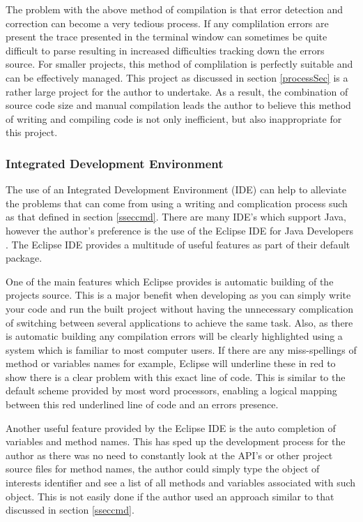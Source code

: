 The problem with the above method of compilation is that error detection and correction can become a very tedious process. If any complilation errors are present the trace presented in the terminal window can sometimes be quite difficult to parse resulting in increased difficulties tracking down the errors source. For smaller projects, this method of complilation is perfectly suitable and can be effectively managed. This project as discussed in section \ref{processSec} is a rather large project for the author to undertake. As a result, the combination of source code size and manual compilation leads the author to believe this method of writing and compiling code is not only inefficient, but also inappropriate for this project.

\subsubsection{Integrated Development Environment}

The use of an Integrated Development Environment (IDE) can help to alleviate the problems that can come from using a writing and complication process such as that defined in section \ref{sseccmd}. There are many IDE's which support Java, however the author's preference is the use of the Eclipse IDE for Java Developers \cite{eclipse:IDE}. The Eclipse IDE provides a multitude of useful features as part of their default package. 

One of the main features which Eclipse provides is automatic building of the projects source. This is a major benefit when developing as you can simply write your code and run the built project without having the unnecessary complication of switching between several applications to achieve the same task. Also, as there is automatic building any compilation errors will be clearly highlighted using a system which is familiar to most computer users. If there are any miss-spellings of method or variables names for example, Eclipse will underline these in red to show there is a clear problem with this exact line of code. This is similar to the default scheme provided by most word processors, enabling a logical mapping between this red underlined line of code and an errors presence.

Another useful feature provided by the Eclipse IDE is the auto completion of variables and method names. This has sped up the development process for the author as there was no need to constantly look at the API's or other project source files for method names, the author could simply type the object of interests identifier and see a list of all methods and variables associated with such object. This is not easily done if the author used an approach similar to that discussed in section \ref{sseccmd}.

